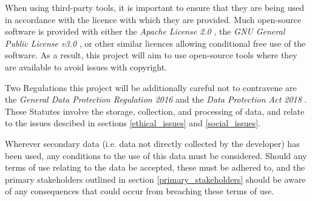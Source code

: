 %
%
%

When using third-party tools, it is important to ensure that they are being used in accordance with the licence with which they are provided.
Much open-source software is provided with either the \textit{Apache License 2.0} \cite{apache_2_0}, the \textit{GNU General Public License v3.0} \cite{gnu_gpl_3}, or other similar licences allowing conditional free use of the software.
As a result, this project will aim to use open-source tools where they are available to avoid issues with copyright.

Two Regulations this project will be additionally careful not to contravene are the \textit{General Data Protection Regulation 2016} \cite{eu_2016_679} and the \textit{Data Protection Act 2018} \cite{uk_dpa_2018}. These Statutes involve the storage, collection, and processing of data, and relate to the issues descibed in sections \ref{ethical_issues} and \ref{social_issues}.

Wherever secondary data (i.e. data not directly collected by the developer) has been used, any conditions to the use of this data must be considered. Should any terms of use relating to the data be accepted, these must be adhered to, and the primary stakeholders outlined in section \ref{primary_stakeholders} should be aware of any consequences that could occur from breaching these terms of use.
